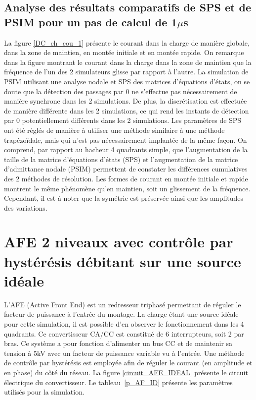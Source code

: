 \clearpage

\subsection{Analyse des résultats comparatifs de SPS et de PSIM pour un pas de calcul de 1$\mu$s}

La figure \ref{DC_ch_cou_1} présente le courant dans la charge de manière globale, dans la zone de maintien, en montée initiale et en montée rapide. On remarque dans la figure montrant le courant dans la charge dans la zone de maintien que la fréquence de l'un des 2 simulateurs glisse par rapport à l'autre. La simulation de PSIM utilisant une analyse nodale et SPS des matrices d'équations d'états, on se doute que la détection des passages par 0 ne s'effectue pas nécessairement de manière synchrone dans les 2 simulations. De plus, la discrétisation est effectuée de manière différente dans les 2 simulations, ce qui rend les instants de détection par 0 potentiellement différents dans les 2 simulations. Les paramètres de SPS ont été réglés de manière à utiliser une méthode similaire à une méthode trapézoïdale, mais qui n'est pas nécessairement implantée de la même façon. On comprend, par rapport au hacheur 4 quadrants simple, que l'augmentation de la taille de la matrice d'équations d'états (SPS) et l'augmentation de la matrice d'admittance nodale (PSIM) permettent de constater les différences cumulatives des 2 méthodes de résolution. Les formes de courant en montée initiale et rapide montrent le même phénomène qu'en maintien, soit un glissement de la fréquence. Cependant, il est à noter que la symétrie est préservée ainsi que les amplitudes des variations.
\section{AFE 2 niveaux avec contrôle par hystérésis débitant sur une source idéale}
L'AFE (Active Front End) est un redresseur triphasé permettant de réguler le facteur de puissance à l'entrée du montage. La charge étant une source idéale pour cette simulation, il est possible d'en observer le fonctionnement dans les 4 quadrants. Ce convertisseur CA/CC est constitué de 6 interrupteurs, soit 2 par bras. Ce système a pour fonction d'alimenter un bus CC et de maintenir sa tension à 5kV avec un facteur de puissance variable vu à l'entrée. Une méthode de contrôle par hystérésis est employée afin de réguler le courant (en amplitude et en phase) du côté du réseau. La figure \ref{circuit_AFE_IDEAL} présente le circuit électrique du convertisseur. Le tableau~\ref{p_AF_ID} présente les paramètres utilisés pour la simulation.

